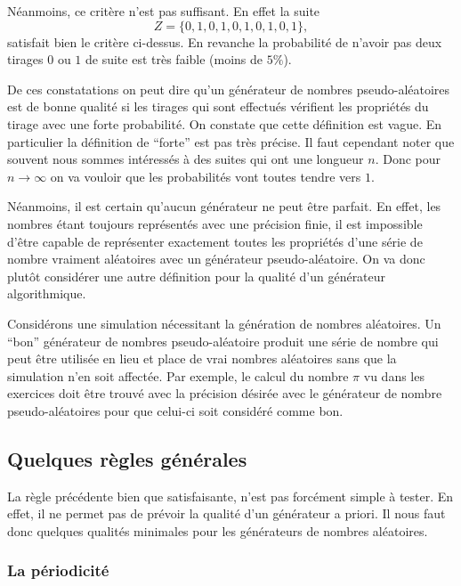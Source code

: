 \documentclass[a4paper,12pt]{book}
\begin{document}
Néanmoins, ce critère n'est pas suffisant. En effet la suite
\begin{equation}
 Z=\{0,1,0,1,0,1,0,1,0,1\},
\end{equation}
satisfait bien le critère ci-dessus. En revanche la probabilité de n'avoir pas deux tirages 
$0$ ou $1$ de suite est très faible (moins de $5\%$). 

De ces constatations on peut dire qu'un générateur de nombres pseudo-aléatoires est de bonne
qualité si les tirages qui sont effectués vérifient les propriétés du tirage 
avec une forte probabilité. On constate que cette définition est vague. En particulier
la définition de ``forte'' est pas très précise. Il faut cependant noter que
souvent nous sommes intéressés à des suites qui ont une longueur $n$. 
Donc pour $n\rightarrow\infty$ on va vouloir que les probabilités vont 
toutes tendre vers $1$. 

Néanmoins, il est certain qu'aucun générateur ne peut être parfait. En effet,
les nombres étant toujours représentés avec une précision finie, il est impossible
d'être capable de représenter exactement toutes les propriétés d'une série de nombre
vraiment aléatoires avec un générateur pseudo-aléatoire. On va donc plutôt
considérer une autre définition pour la qualité d'un générateur algorithmique.

Considérons une simulation nécessitant la génération de nombres aléatoires.
Un ``bon'' générateur de nombres pseudo-aléatoire produit une série de nombre
qui peut être utilisée en lieu et place de vrai nombres aléatoires sans que la simulation
n'en soit affectée. Par exemple, le calcul du nombre $\pi$ vu dans les exercices doit 
être trouvé avec la précision désirée avec le générateur de nombre pseudo-aléatoires pour que celui-ci 
soit considéré comme bon.

\subsection{Quelques règles générales}

La règle précédente bien que satisfaisante, n'est pas forcément simple à tester. En effet,
il ne permet pas de prévoir la qualité d'un générateur a priori. Il nous faut donc quelques 
qualités minimales pour les générateurs de nombres aléatoires.

\subsubsection{La périodicité}
\end{document}
